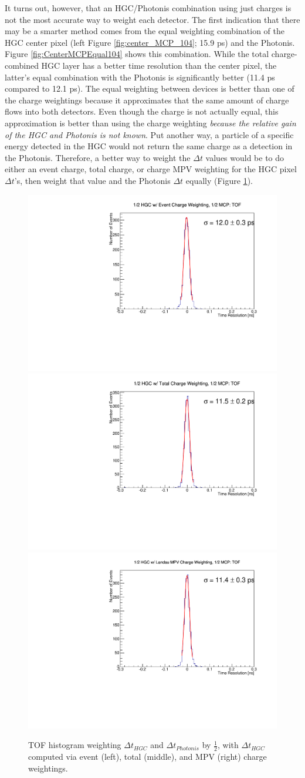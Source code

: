 \documentclass[12pt]{article}
\begin{document}
It turns out, however, that an HGC/Photonis combination using just charges is not the most accurate way to weight each detector. 
The first indication that there may be a smarter method comes from the equal weighting combination of the HGC center pixel (left Figure \ref{fig:center_MCP_104}; 15.9 ps) and the Photonis. 
Figure \ref{fig:CenterMCPEqual104} shows this combination. 
While the total charge-combined HGC layer has a better time resolution than the center pixel, the latter's equal combination with the Photonis is significantly better (11.4 ps compared to 12.1 ps). 
The equal weighting between devices is better than one of the charge weightings because it approximates that the same amount of charge flows into both detectors.
Even though the charge is not actually equal, this approximation is better than using the charge weighting \textit{because the relative gain of the HGC and Photonis is not known}. 
Put another way, a particle of a specific energy detected in the HGC would not return the same charge as a detection in the Photonis. 
Therefore, a better way to weight the $\Delta t$ values would be to do either an event charge, total charge, or charge MPV weighting for the HGC pixel $\Delta t$'s, then weight that value and the Photonis $\Delta t$ equally (Figure \ref{fig:HGCMCP_event_total_MPV_104}).

\begin{figure}[h]
	\centering
	\includegraphics[width=.32\textwidth]{deltaT_PicoSilEventCharge_MCP_Equal104.pdf}
	\includegraphics[width=.32\textwidth]{deltaT_PicoSilTotalCharge_MCP_Equal104.pdf}
	\includegraphics[width=.32\textwidth]{deltaT_PicoSilLandauCharge_MCP_Equal104.pdf}
	\caption{TOF histogram weighting $\Delta t_{HGC}$ and $\Delta t_{Photonis}$ by $\frac{1}{2}$, with $\Delta t_{HGC}$ computed via event (left), total (middle), and MPV (right) charge weightings.}
	\label{fig:HGCMCP_event_total_MPV_104}
\end{figure}
\end{document}
